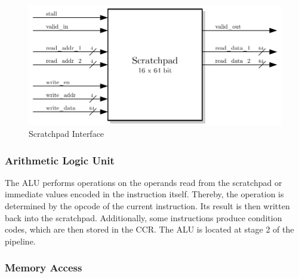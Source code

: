 \begin{figure}[htb]
 \centering
 \includegraphics[scale=1.0]{images/scratchpad_blackbox}
 \caption{Scratchpad Interface}
\label{fig:scp_inf}
\end{figure}


\subsubsection{Arithmetic Logic Unit}

The ALU performs operations on the operands read from the scratchpad or immediate values encoded in the instruction itself.
Thereby, the operation is determined by the opcode of the current instruction.
Its result is then written back into the scratchpad.
Additionally, some instructions produce condition codes, which are then stored in the CCR.
The ALU is located at stage 2 of the pipeline.

\subsubsection{Memory Access}\label{mem_access}

